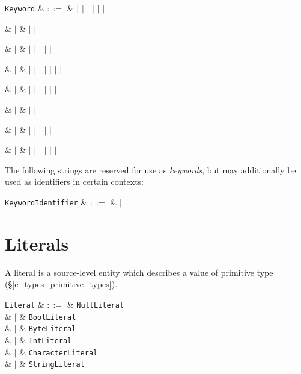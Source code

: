 \begin{syntax}
\verb+Keyword+ & $::=$ &  $|$  $|$
 $|$  $|$  $|$ 
$|$ \\

{\huge\strut} & $|$ &  $|$  $|$  $|$ \\
{\huge\strut} & $|$ &  $|$  $|$  $|$  $|$  $|$ \\
{\huge\strut} & $|$ &  $|$  $|$  $|$  $|$  $|$  $|$  $|$  \\
{\huge\strut} & $|$ &  $|$  $|$  $|$  $|$  $|$  $|$ \\
{\huge\strut} & $|$ &   $|$  $|$  $|$ \\
{\huge\strut} & $|$ &  $|$  $|$  $|$  $|$  $|$ \\
{\huge\strut} & $|$ &  $|$  $|$  $|$  $|$  $|$  $|$ \\
\end{syntax}

The following strings are reserved for use as {\em keywords}, but may additionally be used as identifiers in certain contexts:
\begin{syntax}
\verb+KeywordIdentifier+ & $::=$ &  $|$  $|$ \\
\end{syntax}



\section{Literals}

A \gls{literal} is a source-level entity which describes a value of primitive type (\S\ref{c_types_primitive_types}).

\begin{syntax}
\verb+Literal+ & $::=$ &  \verb+NullLiteral+ \\
  & $|$ & \verb+BoolLiteral+ \\
  & $|$ & \verb+ByteLiteral+ \\
  & $|$ & \verb+IntLiteral+ \\
  & $|$ & \verb+CharacterLiteral+ \\
  & $|$ & \verb+StringLiteral+ \\
\\
\end{syntax}

